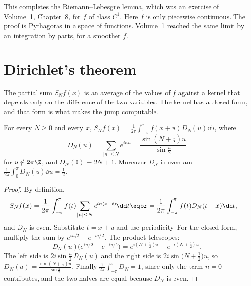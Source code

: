 This completes the Riemann--Lebesgue lemma, which was an exercise of Volume~1, Chapter~8, for $f$ of class $C^1$. Here $f$ is only piecewise continuous. The proof is Pythagoras in a space of functions. Volume~1 reached the same limit by an integration by parts, for a smoother $f$.

\section{Dirichlet's theorem}

The partial sum $S_Nf(x)$ is an average of the values of $f$ against a kernel that depends only on the difference of the two variables. The kernel has a closed form, and that form is what makes the jump computable.

\begin{lemma}\label{lem:dirichletkernel}
For every $N\ge0$ and every $x$, $S_Nf(x)=\frac1{2\pi}\int_{-\pi}^\pi f(x+u)D_N(u)\dd u$, where
\[
D_N(u)=\sum_{|n|\le N}e^{inu}=\frac{\sin(N+\frac12)u}{\sin\frac u2}
\]
for $u\notin2\pi\Z$, and $D_N(0)=2N+1$. Moreover $D_N$ is even and $\frac1{2\pi}\int_0^\pi D_N(u)\dd u=\frac12$.
\end{lemma}
\begin{proof}
By definition,
\[
\begin{aligned}S_Nf(x)&=\frac1{2\pi}\int_{-\pi}^\pi f(t)\sum_{|n|\le N}e^{in(x-t)}\dd t\eqbr=\frac1{2\pi}\int_{-\pi}^\pi f(t)D_N(t-x)\dd t,\end{aligned}
\]
and $D_N$ is even. Substitute $t=x+u$ and use periodicity. For the closed form, multiply the sum by $e^{iu/2}-e^{-iu/2}$. The product telescopes:
\[
D_N(u)\bigl(e^{iu/2}-e^{-iu/2}\bigr)=e^{i(N+\frac12)u}-e^{-i(N+\frac12)u}.
\]
The left side is $2i\sin\frac u2\,D_N(u)$ and the right side is $2i\sin\bigl(N+\frac12\bigr)u$, so $D_N(u)=\frac{\sin(N+\frac12)u}{\sin\frac u2}$. Finally $\frac1{2\pi}\int_{-\pi}^\pi D_N=1$, since only the term $n=0$ contributes, and the two halves are equal because $D_N$ is even.
\end{proof}

